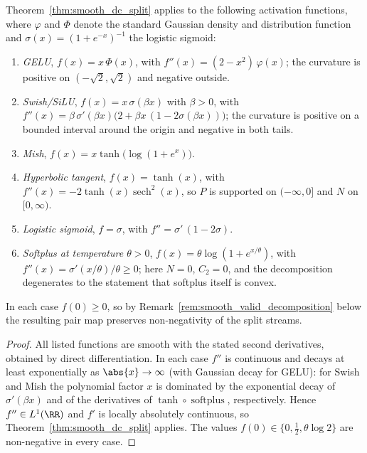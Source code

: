 \begin{corollary}\label{cor:modern_activations}
Theorem~\ref{thm:smooth_dc_split} applies to the following activation functions, where $\varphi$ and $\Phi$ denote the standard Gaussian density and distribution function and $\sigma(x) = (1+e^{-x})^{-1}$ the logistic sigmoid:
\begin{enumerate}
	\item \emph{GELU}, $f(x) = x\,\Phi(x)$, with $f''(x) = (2 - x^2)\,\varphi(x)$; the curvature is positive on $(-\sqrt{2}, \sqrt{2})$ and negative outside.
	\item \emph{Swish/SiLU}, $f(x) = x\,\sigma(\beta x)$ with $\beta > 0$, with $f''(x) = \beta\,\sigma'(\beta x)\bigl( 2 + \beta x\,(1 - 2\sigma(\beta x)) \bigr)$; the curvature is positive on a bounded interval around the origin and negative in both tails.
	\item \emph{Mish}, $f(x) = x \tanh\bigl(\log(1 + e^{x})\bigr)$.
	\item \emph{Hyperbolic tangent}, $f(x) = \tanh(x)$, with $f''(x) = -2 \tanh(x)\operatorname{sech}^2(x)$, so $P$ is supported on $(-\infty, 0]$ and $N$ on $[0, \infty)$.
	\item \emph{Logistic sigmoid}, $f = \sigma$, with $f'' = \sigma'\,(1 - 2\sigma)$.
	\item \emph{Softplus at temperature $\theta > 0$}, $f(x) = \theta \log(1 + e^{x/\theta})$, with $f''(x) = \sigma'(x/\theta)/\theta \ge 0$; here $N = 0$, $C_2 = 0$, and the decomposition degenerates to the statement that softplus itself is convex.
\end{enumerate}
In each case $f(0) \ge 0$, so by Remark~\ref{rem:smooth_valid_decomposition} below the resulting pair map preserves non-negativity of the split streams.
\end{corollary}

\begin{proof}
All listed functions are smooth with the stated second derivatives, obtained by direct differentiation. In each case $f''$ is continuous and decays at least exponentially as $\abs{x} \to \infty$ (with Gaussian decay for GELU): for Swish and Mish the polynomial factor $x$ is dominated by the exponential decay of $\sigma'(\beta x)$ and of the derivatives of $\tanh \circ \operatorname{softplus}$, respectively. Hence $f'' \in L^1(\RR)$ and $f'$ is locally absolutely continuous, so Theorem~\ref{thm:smooth_dc_split} applies. The values $f(0) \in \{0, \tfrac{1}{2}, \theta \log 2\}$ are non-negative in every case.
\end{proof}

